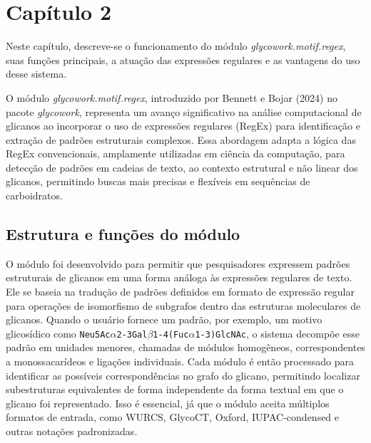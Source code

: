 \chapter{Capítulo 2}

Neste capítulo, descreve-se o funcionamento do módulo \textit{glycowork.motif.regex}, suas funções principais, a atuação das expressões regulares e as vantagens do uso desse sistema.

O módulo \textit{glycowork.motif.regex}, introduzido por Bennett e Bojar (2024) no pacote \textit{glycowork}, representa um avanço significativo na análise computacional de glicanos ao incorporar o uso de expressões regulares (RegEx) para identificação e extração de padrões estruturais complexos. Essa abordagem adapta a lógica das RegEx convencionais, amplamente utilizadas em ciência da computação, para detecção de padrões em cadeias de texto, ao contexto estrutural e não linear dos glicanos, permitindo buscas mais precisas e flexíveis em sequências de carboidratos.

\section{Estrutura e funções do módulo}

O módulo foi desenvolvido para permitir que pesquisadores expressem padrões estruturais de glicanos em uma forma análoga às expressões regulares de texto. Ele se baseia na tradução de padrões definidos em formato de expressão regular para operações de isomorfismo de subgrafos dentro das estruturas moleculares de glicanos. Quando o usuário fornece um padrão, por exemplo, um motivo glicosídico como \texttt{Neu5Ac$\alpha$2-3Gal$\beta$1-4(Fuc$\alpha$1-3)GlcNAc}, o sistema decompõe esse padrão em unidades menores, chamadas de módulos homogêneos, correspondentes a monossacarídeos e ligações individuais. Cada módulo é então processado para identificar as possíveis correspondências no grafo do glicano, permitindo localizar subestruturas equivalentes de forma independente da forma textual em que o glicano foi representado. Isso é essencial, já que o módulo aceita múltiplos formatos de entrada, como WURCS, GlycoCT, Oxford, IUPAC-condensed e outras notações padronizadas.


